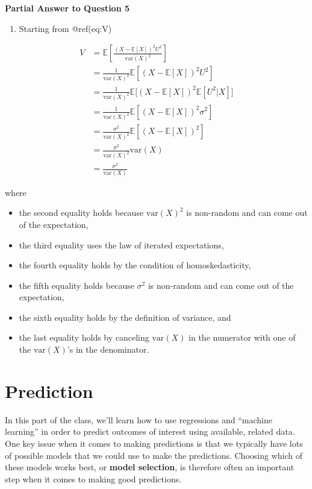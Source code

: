\documentclass[
  letterpaper,
  DIV=11,
  numbers=noendperiod]{scrreprt}
\providecommand{\tightlist}{%
  \setlength{\itemsep}{0pt}\setlength{\parskip}{0pt}}\usepackage{longtable,booktabs,array}
\begin{document}
\textbf{Partial Answer to Question 5}

\begin{enumerate}
\def\labelenumi{\alph{enumi})}
\tightlist
\item
  Starting from @ref(eq:V)
\end{enumerate}

\begin{align*}
    V &= \mathbb{E}\left[ \frac{(X - \mathbb{E}[X])^2 U^2}{\mathrm{var}(X)^2} \right] \\
    &= \frac{1}{\mathrm{var}(X)^2} \mathbb{E}[(X-\mathbb{E}[X])^2 U^2] \\
    &= \frac{1}{\mathrm{var}(X)^2} \mathbb{E}\big[(X-\mathbb{E}[X])^2 \mathbb{E}[U^2|X] \big] \\
    &= \frac{1}{\mathrm{var}(X)^2} \mathbb{E}[(X-\mathbb{E}[X])^2 \sigma^2 ] \\
    &= \frac{\sigma^2}{\mathrm{var}(X)^2} \mathbb{E}[(X-\mathbb{E}[X])^2] \\
    &= \frac{\sigma^2}{\mathrm{var}(X)^2} \mathrm{var}(X) \\
    &= \frac{\sigma^2}{\mathrm{var}(X)}
  \end{align*}

where

\begin{itemize}
\item
  the second equality holds because \(\mathrm{var}(X)^2\) is non-random
  and can come out of the expectation,
\item
  the third equality uses the law of iterated expectations,
\item
  the fourth equality holds by the condition of homoskedasticity,
\item
  the fifth equality holds because \(\sigma^2\) is non-random and can
  come out of the expectation,
\item
  the sixth equality holds by the definition of variance, and
\item
  the last equality holds by canceling \(\mathrm{var}(X)\) in the
  numerator with one of the \(\mathrm{var}(X)\)'s in the denominator.
\end{itemize}


\chapter{Prediction}\label{prediction}

In this part of the class, we'll learn how to use regressions and
``machine learning'' in order to predict outcomes of interest using
available, related data. One key issue when it comes to making
predictions is that we typically have lots of possible models that we
could use to make the predictions. Choosing which of these models works
best, or \textbf{model selection}, is therefore often an important step
when it comes to making good predictions.
\end{document}
